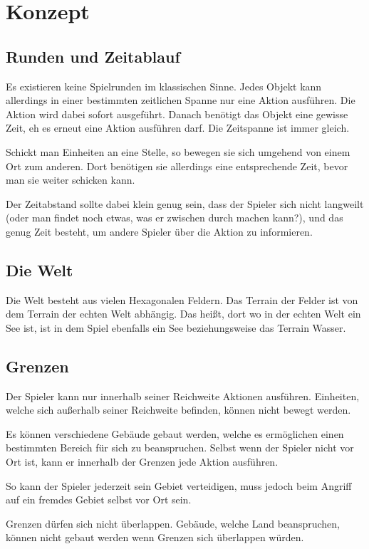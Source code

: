 \chapter{Konzept}
\label{Konzept}

\section{Runden und Zeitablauf}
Es existieren keine Spielrunden im klassischen Sinne. Jedes Objekt kann allerdings in einer bestimmten zeitlichen Spanne nur eine Aktion ausführen. Die Aktion wird dabei sofort ausgeführt. Danach benötigt das Objekt eine gewisse Zeit, eh es erneut eine Aktion ausführen darf. Die Zeitspanne ist immer gleich.

Schickt man Einheiten an eine Stelle, so bewegen sie sich umgehend von einem Ort zum anderen. Dort benötigen sie allerdings eine entsprechende Zeit, bevor man sie weiter schicken kann.

Der Zeitabstand sollte dabei klein genug sein, dass der Spieler sich nicht langweilt (oder man findet noch etwas, was er zwischen durch machen kann?), und das genug Zeit besteht, um andere Spieler über die Aktion zu informieren.

\section{Die Welt}
Die Welt besteht aus vielen Hexagonalen Feldern. Das Terrain der Felder ist von dem Terrain der echten Welt abhängig. Das heißt, dort wo in der echten Welt ein See ist, ist in dem Spiel ebenfalls ein See beziehungsweise das Terrain Wasser.

\section{Grenzen}
Der Spieler kann nur innerhalb seiner Reichweite Aktionen ausführen. Einheiten, welche sich außerhalb seiner Reichweite befinden, können nicht bewegt werden. 

Es können verschiedene Gebäude gebaut werden, welche es ermöglichen einen bestimmten Bereich für sich zu beanspruchen. Selbst wenn der Spieler nicht vor Ort ist, kann er innerhalb der Grenzen jede Aktion ausführen. 

So kann der Spieler jederzeit sein Gebiet verteidigen, muss jedoch beim Angriff auf ein fremdes Gebiet selbst vor Ort sein.

Grenzen dürfen sich nicht überlappen. Gebäude, welche Land beanspruchen, können nicht gebaut werden wenn Grenzen sich überlappen würden.




